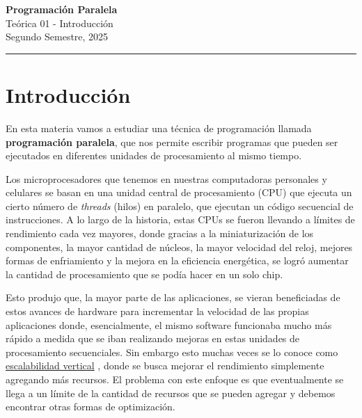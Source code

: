 



\begin{center}
    \LARGE\textbf{Programación Paralela} \\
    \Large{Teórica 01 - Introducción} \\
    \normalsize{Segundo Semestre, 2025} \\
    \vspace{1em}
    \hrule
\end{center}

\vspace{1em}


\section*{Introducción}
\label{sec:introduccion}

En esta materia vamos a estudiar una técnica de programación llamada \textbf{programación paralela}, que nos permite
escribir programas que pueden ser ejecutados en diferentes unidades de procesamiento al mismo tiempo.

Los microprocesadores que tenemos en nuestras computadoras personales y celulares se basan en una unidad central de
procesamiento (CPU) que ejecuta un cierto número de \textit{threads} (hilos) en paralelo, que ejecutan un código
secuencial de instrucciones. A lo largo de la historia, estas CPUs se fueron llevando a límites de rendimiento cada vez
mayores, donde gracias a la miniaturización de los componentes, la mayor cantidad de núcleos, la mayor velocidad del
reloj, mejores formas de enfriamiento y la mejora en la eficiencia energética, se logró aumentar la cantidad de
procesamiento que se podía hacer en un solo chip.

Esto produjo que, la mayor parte de las aplicaciones, se vieran beneficiadas de estos avances de hardware para
incrementar la velocidad de las propias aplicaciones donde, esencialmente, el mismo software funcionaba mucho más rápido
a medida que se iban realizando mejoras en estas unidades de procesamiento secuenciales. Sin embargo esto muchas veces
se lo conoce como \href{https://es.wikipedia.org/wiki/Escalabilidad#Escalabilidad_vertical}{escalabilidad vertical} ,
donde se busca mejorar el rendimiento simplemente agregando más recursos. El problema con este enfoque es que
eventualmente se llega a un límite de la cantidad de recursos que se pueden agregar y debemos encontrar otras formas de
optimización.

